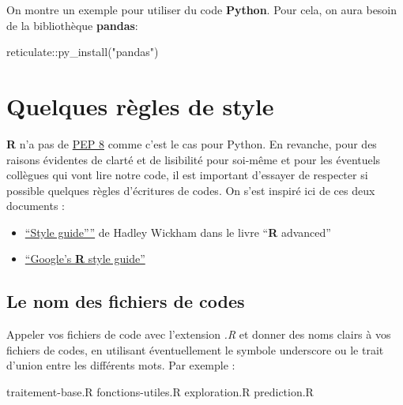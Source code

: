 \documentclass[
]{book}
\newenvironment{Shaded}{\begin{snugshade}}{\end{snugshade}}
\newcommand{\FunctionTok}[1]{\textcolor[rgb]{0.00,0.00,0.00}{#1}}
\newcommand{\NormalTok}[1]{#1}
\newcommand{\SpecialCharTok}[1]{\textcolor[rgb]{0.00,0.00,0.00}{#1}}
\newcommand{\StringTok}[1]{\textcolor[rgb]{0.31,0.60,0.02}{#1}}
\theoremstyle{definition}
\theoremstyle{definition}
\theoremstyle{definition}
\theoremstyle{definition}
\theoremstyle{remark}
\begin{document}
On montre un exemple pour utiliser du code \textbf{Python}. Pour cela, on aura besoin de la bibliothèque \textbf{pandas}:

\begin{Shaded}
\begin{Highlighting}[]
\NormalTok{reticulate}\SpecialCharTok{::}\FunctionTok{py\_install}\NormalTok{(}\StringTok{"pandas"}\NormalTok{)}
\end{Highlighting}
\end{Shaded}

\hypertarget{quelques-ruxe8gles-de-style}{%
\section{Quelques règles de style}\label{quelques-ruxe8gles-de-style}}

\textbf{R} n'a pas de \href{https://www.python.org/dev/peps/pep-0008/}{PEP 8} comme c'est le cas pour Python. En revanche, pour des raisons évidentes de clarté et de lisibilité pour soi-même et pour les éventuels collègues qui vont lire notre code, il est important d'essayer de respecter si possible quelques règles d'écritures de codes. On s'est inspiré ici de ces deux documents :

\begin{itemize}
\item
  \href{http://adv-r.had.co.nz/Style.html}{``Style guide''''} de Hadley Wickham dans le livre ``\textbf{R} advanced''
\item
  \href{https://google.github.io/styleguide/Rguide.xml}{``Google's \textbf{R} style guide''}
\end{itemize}

\hypertarget{le-nom-des-fichiers-de-codes}{%
\subsection{Le nom des fichiers de codes}\label{le-nom-des-fichiers-de-codes}}

Appeler vos fichiers de code avec l'extension \emph{.R} et donner des noms clairs à vos fichiers de codes, en utilisant éventuellement le symbole underscore ou le trait d'union entre les différents mots. Par exemple :

\begin{Shaded}
\begin{Highlighting}[]
\NormalTok{traitement}\SpecialCharTok{{-}}\NormalTok{base.R}
\NormalTok{fonctions}\SpecialCharTok{{-}}\NormalTok{utiles.R}
\NormalTok{exploration.R}
\NormalTok{prediction.R}
\end{Highlighting}
\end{Shaded}
\end{document}
